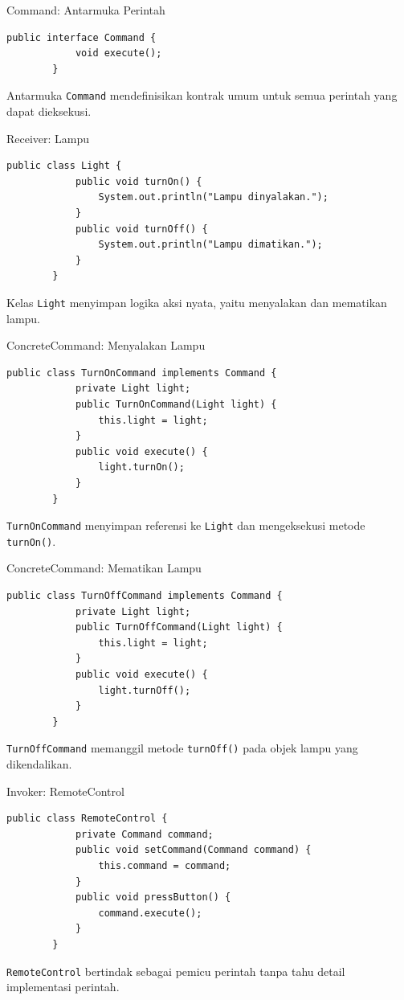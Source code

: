 \documentclass[aspectratio=169, table]{beamer}
\begin{document}
\begin{frame}[fragile]{Command: Antarmuka Perintah}
	\begin{lstlisting}[style=JavaStyle]
		public interface Command {
			void execute();
		}
	\end{lstlisting}
	\small Antarmuka \texttt{Command} mendefinisikan kontrak umum untuk semua perintah yang dapat dieksekusi.
\end{frame}

\begin{frame}[fragile]{Receiver: Lampu}
	\begin{lstlisting}[style=JavaStyle]
		public class Light {
			public void turnOn() {
				System.out.println("Lampu dinyalakan.");
			}
			public void turnOff() {
				System.out.println("Lampu dimatikan.");
			}
		}
	\end{lstlisting}
	\small Kelas \texttt{Light} menyimpan logika aksi nyata, yaitu menyalakan dan mematikan lampu.
\end{frame}

\begin{frame}[fragile]{ConcreteCommand: Menyalakan Lampu}
	\begin{lstlisting}[style=JavaStyle]
		public class TurnOnCommand implements Command {
			private Light light;
			public TurnOnCommand(Light light) {
				this.light = light;
			}
			public void execute() {
				light.turnOn();
			}
		}
	\end{lstlisting}
	\small \texttt{TurnOnCommand} menyimpan referensi ke \texttt{Light} dan mengeksekusi metode \texttt{turnOn()}.
\end{frame}

\begin{frame}[fragile]{ConcreteCommand: Mematikan Lampu}
	\begin{lstlisting}[style=JavaStyle]
		public class TurnOffCommand implements Command {
			private Light light;
			public TurnOffCommand(Light light) {
				this.light = light;
			}
			public void execute() {
				light.turnOff();
			}
		}
	\end{lstlisting}
	\small \texttt{TurnOffCommand} memanggil metode \texttt{turnOff()} pada objek lampu yang dikendalikan.
\end{frame}

\begin{frame}[fragile]{Invoker: RemoteControl}
	\begin{lstlisting}[style=JavaStyle]
		public class RemoteControl {
			private Command command;
			public void setCommand(Command command) {
				this.command = command;
			}
			public void pressButton() {
				command.execute();
			}
		}
	\end{lstlisting}
	\small \texttt{RemoteControl} bertindak sebagai pemicu perintah tanpa tahu detail implementasi perintah.
\end{frame}
\end{document}
